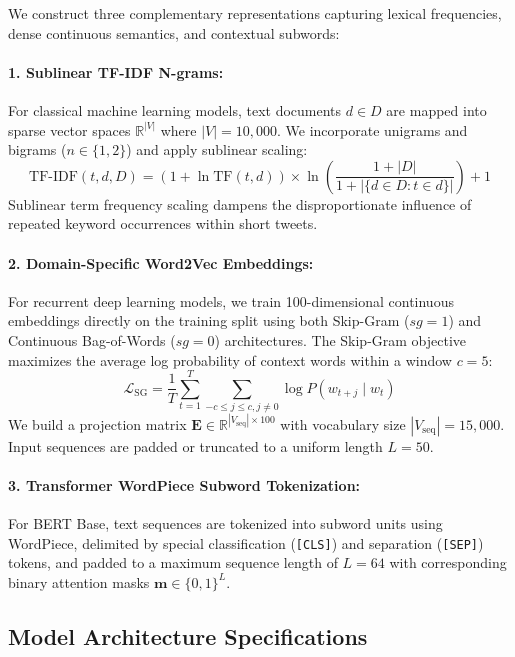 \documentclass[11pt,a4paper]{article}
\begin{document}
We construct three complementary representations capturing lexical frequencies, dense continuous semantics, and contextual subwords:

\paragraph{1. Sublinear TF-IDF N-grams:}
For classical machine learning models, text documents $d \in D$ are mapped into sparse vector spaces $\mathbb{R}^{|V|}$ where $|V| = 10,000$. We incorporate unigrams and bigrams ($n \in \{1, 2\}$) and apply sublinear scaling:
\begin{equation}
\text{TF-IDF}(t, d, D) = \left(1 + \ln \text{TF}(t, d)\right) \times \ln\left(\frac{1 + |D|}{1 + |\{d \in D : t \in d\}|}\right) + 1
\end{equation}
Sublinear term frequency scaling dampens the disproportionate influence of repeated keyword occurrences within short tweets.

\paragraph{2. Domain-Specific Word2Vec Embeddings:}
For recurrent deep learning models, we train 100-dimensional continuous embeddings directly on the training split using both Skip-Gram ($sg=1$) and Continuous Bag-of-Words ($sg=0$) architectures. The Skip-Gram objective maximizes the average log probability of context words within a window $c=5$:
\begin{equation}
\mathcal{L}_{\text{SG}} = \frac{1}{T} \sum_{t=1}^T \sum_{-c \le j \le c, j \ne 0} \log P(w_{t+j} \mid w_t)
\end{equation}
We build a projection matrix $\mathbf{E} \in \mathbb{R}^{|V_{\text{seq}}| \times 100}$ with vocabulary size $|V_{\text{seq}}| = 15,000$. Input sequences are padded or truncated to a uniform length $L = 50$.

\paragraph{3. Transformer WordPiece Subword Tokenization:}
For BERT Base, text sequences are tokenized into subword units using WordPiece, delimited by special classification (\texttt{[CLS]}) and separation (\texttt{[SEP]}) tokens, and padded to a maximum sequence length of $L = 64$ with corresponding binary attention masks $\mathbf{m} \in \{0, 1\}^L$.

\subsection{Model Architecture Specifications}
\label{sec:models}
\end{document}
